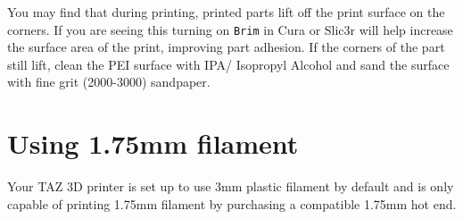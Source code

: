 You may find that during printing, printed parts lift off the print surface on the corners. If you are seeing this turning on \texttt{Brim} in Cura or Slic3r will help increase the surface area of the print, improving part adhesion. If the corners of the part still lift, clean the PEI surface with IPA/ Isopropyl Alcohol and sand the surface with fine grit (2000-3000) sandpaper.


\section{Using 1.75mm filament}

Your TAZ 3D printer is set up to use 3mm plastic filament by default and is only capable of printing 1.75mm filament by purchasing a compatible 1.75mm hot end.
